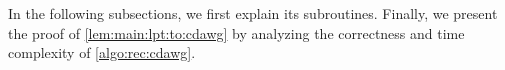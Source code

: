 \documentclass{article}
\begin{document}
In the following subsections, we first explain its subroutines. Finally, we present the proof of \cref{lem:main:lpt:to:cdawg} by analyzing the correctness and time complexity of \cref{algo:rec:cdawg}. 

\end{document}
